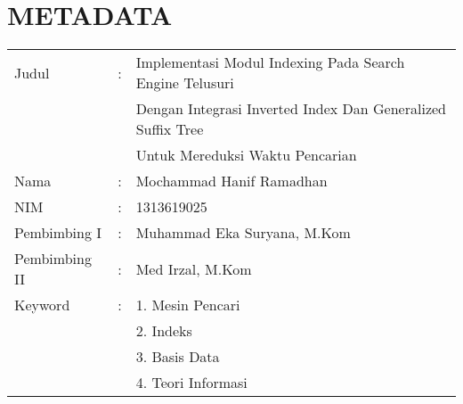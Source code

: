 \pagestyle{empty}
\chapter*{\centering \large METADATA}
\thispagestyle{empty}
\onehalfspacing{}

\vspace{2cm}
\noindent
\begin{tabular}{lcl}
	Judul	& :&  Implementasi Modul Indexing Pada Search Engine Telusuri\\
	& & Dengan Integrasi Inverted Index Dan Generalized Suffix Tree\\
	& & Untuk Mereduksi Waktu Pencarian \\
	Nama	& :&  Mochammad Hanif Ramadhan \\
	NIM	& :&  1313619025 \\
	Pembimbing I	& :&  Muhammad Eka Suryana, M.Kom \\
	Pembimbing II	& :&  Med Irzal, M.Kom \\
	Keyword	& :& 1. Mesin Pencari \\
	& & 2. Indeks \\
	& & 3. Basis Data \\
	& & 4. Teori Informasi
\end{tabular}
\vspace{0.5cm}
